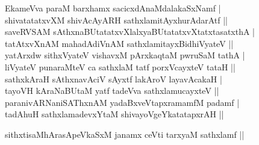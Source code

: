 \begin{entry}
\smallskip
\begin{shl}
EkameVva paraM barxhamx sacicxdAnaMdalakaSxNamf |\\[1pt]
shivatatatxvXM shivAcAyARH sathxlamitAyxhurAdarAtf ||\\[1pt]
saveRVSAM sAthxnaBUtatatxvXlalxyaBUtatatxvXtatxtasatxthA |\\[1pt]
tatAtxvXnAM mahadAdiVnAM sathxlamitayxBidhiVyateV ||\\[1pt]
yatArxdw sithxVyateV vishavxM pArxkaqtaM pwruSaM tathA |\\[1pt]
liVyateV punaraMteV ca sathxlaM tatf porxVcayxteV tataH ||\\[1pt]
sathxkAraH sAthxnavAciV sAyxtf lakAroV layavAcakaH |\\[1pt]
tayoVH kAraNaBUtaM yatf tadeVva sathxlamucayxteV ||\\[1pt]
paranivARNaniSAThxnAM yadaBxveVtapxramamfM padamf |\\[1pt]
tadAhuH sathxlamadevxYtaM shivayoVgeYkatatapxrAH ||
\end{shl}
\medskip
{}
\smallskip
\begin{shl}
sithxtisaMhArasApeVkaSxM janamx ceVti tarxyaM sathxlamf ||
\end{shl}
\medskip
{}
\smallskip

\end{entry}
